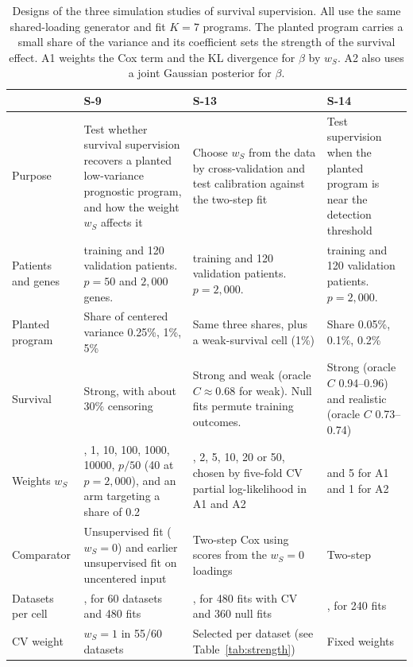 \begin{table}[!htb]
\centering
\small
\setlength{\tabcolsep}{4pt}
\begin{tabular}{>{\raggedright\arraybackslash}p{0.82in}>{\raggedright\arraybackslash}p{1.72in}>{\raggedright\arraybackslash}p{1.72in}>{\raggedright\arraybackslash}p{1.72in}}
\toprule
 & S-9 & S-13 & S-14 \\
\midrule
Purpose & Test whether survival supervision recovers a planted low-variance prognostic program, and how the weight $w_S$ affects it
 & Choose $w_S$ from the data by cross-validation and test calibration against the two-step fit
 & Test supervision when the planted program is near the detection threshold \\
\addlinespace
Patients and genes & 400 training and 120 validation patients. $p = 50$ and $2{,}000$ genes.
 & 400 training and 120 validation patients. $p = 2{,}000$.
 & 400 training and 120 validation patients. $p = 2{,}000$. \\
\addlinespace
Planted program & Share of centered variance 0.25\%, 1\%, 5\%
 & Same three shares, plus a weak-survival cell (1\%)
 & Share 0.05\%, 0.1\%, 0.2\% \\
\addlinespace
Survival & Strong, with about 30\% censoring
 & Strong and weak (oracle $C \approx 0.68$ for weak). Null fits permute training outcomes.
 & Strong (oracle $C$ 0.94--0.96) and realistic (oracle $C$ 0.73--0.74) \\
\addlinespace
Weights $w_S$ & 0, 1, 10, 100, 1000, 10000, $p/50$ (40 at $p = 2{,}000$), and an arm targeting a share of 0.2
 & 1, 2, 5, 10, 20 or 50, chosen by five-fold CV partial log-likelihood in A1 and A2
 & 1 and 5 for A1 and 1 for A2 \\
\addlinespace
Comparator & Unsupervised fit ($w_S = 0$) and earlier unsupervised fit on uncentered input
 & Two-step Cox using scores from the $w_S = 0$ loadings
 & Two-step \\
\addlinespace
Datasets per cell & 10, for 60 datasets and 480 fits
 & 10, for 480 fits with CV and 360 null fits
 & 10, for 240 fits \\
\addlinespace
CV weight & $w_S = 1$ in 55/60 datasets
 & Selected per dataset (see Table~\ref{tab:strength})
 & Fixed weights \\
\bottomrule
\end{tabular}
\caption{Designs of the three simulation studies of survival supervision. All use the same shared-loading generator and fit $K = 7$ programs. The planted program carries a small share of the variance and its coefficient sets the strength of the survival effect. A1 weights the Cox term and the KL divergence for $\beta$ by $w_S$. A2 also uses a joint Gaussian posterior for $\beta$.}
\label{tab:sim-design}
\end{table}
